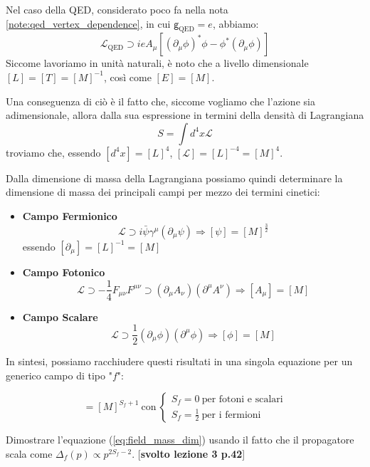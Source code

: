 \documentclass[../main.tex]{subfiles}
\begin{document}
Nel caso della QED, considerato poco fa nella nota \ref{note:qed_vertex_dependence}, in cui $\mathsf g_\text{QED} = e$, abbiamo:
\[
\mathscr{L}_\text{QED} \supset ieA_\mu[(\partial_\mu\phi)^*\phi-\phi^*(\partial_\mu\phi)]
\]
Siccome lavoriamo in unità naturali, è noto che a livello dimensionale $[L]=[T]=[M]^{-1}$, così come $[E]=[M]$.

Una conseguenza di ciò è il fatto che, siccome vogliamo che l'azione sia adimensionale, allora dalla sua espressione in termini della densità di Lagrangiana
\[
 S = \int d^4x \mathscr{L} 
\]
troviamo che, essendo $[d^4x] = [L]^4$, $[\mathscr{L}]=[L]^{-4} = [M]^4$.

Dalla dimensione di massa della Lagrangiana possiamo quindi determinare la dimensione di massa dei principali campi per mezzo dei termini cinetici:
\begin{itemize}
    \item \textbf{Campo Fermionico}\\
          \[
          \mathscr{L} \supset i\bar\psi\gamma^\mu(\partial_\mu\psi) \Rightarrow \boxed{[\psi] = [M]^{\frac{3}{2}}}
          \]
          essendo $[\partial_\mu]=[L]^{-1}=[M]$
    \item \textbf{Campo Fotonico}
          \[
          \mathscr{L} \supset -\frac{1}{4}F_{\mu\nu}F^{\mu\nu} \supset (\partial_\mu A_\nu)(\partial^\mu A^\nu) \Rightarrow \boxed{[A_\mu] = [M]}
          \]
    \item \textbf{Campo Scalare}
          \[
          \mathscr{L} \supset \frac{1}{2}(\partial_\mu \phi)(\partial^\mu \phi) \Rightarrow \boxed{[\phi] = [M]}
          \]
\end{itemize}

In sintesi, possiamo racchiudere questi risultati in una singola equazione per un generico campo di tipo "$f$":

\begin{equation} 
[\phi_f]=[M]^{S_f+1} ~ \text{con} ~
\begin{cases}
    S_f=0 ~ \text{per fotoni e scalari}\\
    S_f=\frac{1}{2} ~ \text{per i fermioni}
\end{cases}
\label{eq:field_mass_dim}
\end{equation}

\begin{exercise}
    Dimostrare l'equazione (\ref{eq:field_mass_dim}) usando il fatto che il propagatore scala come $\Delta_f(p)\propto p^{2S_f-2}$. [\textbf{svolto lezione 3 p.42}]
\end{exercise}
\end{document}
